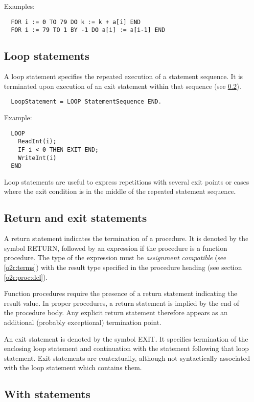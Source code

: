 \noindent
Examples:
\begin{verbatim}
  FOR i := 0 TO 79 DO k := k + a[i] END
  FOR i := 79 TO 1 BY -1 DO a[i] := a[i-1] END
\end{verbatim}

\subsection{Loop statements}

A loop statement specifies the repeated execution of a statement sequence.
It is terminated upon execution of an exit statement within that sequence
(see \ref{o2r:return}).
{\BNFsize
\begin{verbatim}
  LoopStatement = LOOP StatementSequence END.
\end{verbatim}}

\noindent
Example:
\begin{verbatim}
  LOOP
    ReadInt(i);
    IF i < 0 THEN EXIT END;
    WriteInt(i)
  END
\end{verbatim}
Loop statements are useful to express repetitions with several exit
points or cases where the exit condition is in the middle of the repeated
statement sequence.

\subsection{Return and exit statements}\label{o2r:return}

A return statement indicates the termination of a procedure. It is
denoted by the symbol RETURN, followed by an expression if the procedure
is a function procedure. The type of the expression must be {\em assignment
compatible} (see \ref{o2r:terms}) with the result type
specified in the procedure heading (see section \ref{o2r:proc:dcl}).

Function procedures require the presence of a return statement indicating
the result value. In proper procedures, a return statement is implied
by the end of the procedure body. Any explicit return statement therefore
appears as an additional (probably exceptional) termination point.

An exit statement is denoted by the symbol EXIT. It specifies termination
of the enclosing loop statement and continuation with the statement
following that loop statement. Exit statements are contextually, although
not syntactically associated with the loop statement which contains
them.

\subsection{With statements}

